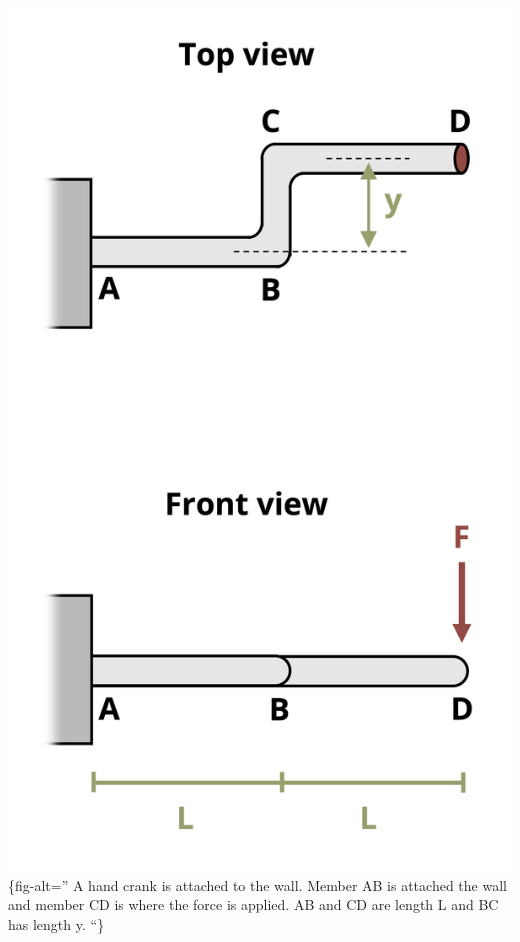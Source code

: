 \documentclass[
  letterpaper,
  DIV=11,
  numbers=noendperiod]{scrreprt}
\begin{document}
\includegraphics{images/267.png}\{fig-alt='' A hand crank is attached to
the wall. Member AB is attached the wall and member CD is where the
force is applied. AB and CD are length L and BC has length y. ``\}
\end{document}
